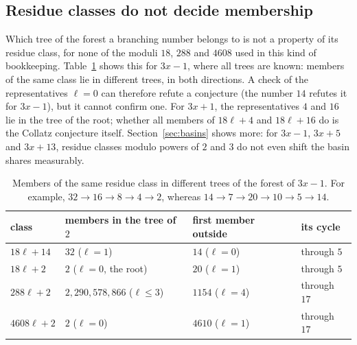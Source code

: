 \documentclass[12pt]{amsart}
\theoremstyle{definition}
\theoremstyle{remark}
\begin{document}
\subsection*{Residue classes do not decide membership}
Which tree of the forest a branching number belongs to is not a property of its residue class, for none of the moduli $18$, $288$ and $4608$ used in this kind of bookkeeping. Table~\ref{table:classes} shows this for $3x-1$, where all trees are known: members of the same class lie in different trees, in both directions. A check of the representatives $\ell=0$ can therefore refute a conjecture (the number $14$ refutes it for $3x-1$), but it cannot confirm one. For $3x+1$, the representatives $4$ and $16$ lie in the tree of the root; whether all members of $18\ell+4$ and $18\ell+16$ do is the Collatz conjecture itself. Section~\ref{sec:basins} shows more: for $3x-1$, $3x+5$ and $3x+13$, residue classes modulo powers of $2$ and $3$ do not even shift the basin shares measurably.

\begin{table}[H]
\centering
\small
\begin{tabular}{llll}
\toprule
class & members in the tree of $2$ & first member outside & its cycle \\
\midrule
$18\ell+14$ & $32$ ($\ell=1$) & $14$ ($\ell=0$) & through $5$ \\
$18\ell+2$ & $2$ ($\ell=0$, the root) & $20$ ($\ell=1$) & through $5$ \\
$288\ell+2$ & $2,290,578,866$ ($\ell\le3$) & $1154$ ($\ell=4$) & through $17$ \\
$4608\ell+2$ & $2$ ($\ell=0$) & $4610$ ($\ell=1$) & through $17$ \\
\bottomrule
\end{tabular}
\caption{Members of the same residue class in different trees of the forest of $3x-1$. For example, $32\to16\to8\to4\to2$, whereas $14\to7\to20\to10\to5\to14$.}
\label{table:classes}
\end{table}

\end{document}
